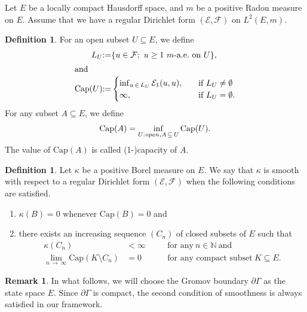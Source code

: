 \documentclass[10pt]{amsart}
\theoremstyle{definition}\newtheorem{defi}[theo]{Definition}\newtheorem{rema}[theo]{Remark}\newtheorem{exam}[theo]{Example}\newtheorem{exem}[theo]{Example}\newtheorem{nota}[theo]{Notation}
\newcommand{\ce}{\mathcal{E}}
\newcommand{\cf}{\mathcal{F}}
\newcommand{\bn}{\mathbb{N}}
\newcommand{\Capp}{\mathrm{Cap}}
\begin{document}
Let $E$ be a locally compact Hausdorff space, and $m$ be a positive Radon measure on $E$. Assume that we have a regular Dirichlet form $(\ce,\cf)$ on $L^2(E,m)$.
\begin{defi}
For an open subset $U\subseteq E$, we define
\begin{align*}
L_U &{:=}\{u\in\cf;\ u\geq1\ m\mathchar`-\text{a.e.\ on}\ U\},
\\
\intertext{and}
\Capp(U)&{:=}
\begin{cases}
\inf_{u\,\in\,L_U}\ce_1(u,u),\quad &\text{if}\ L_U\neq\emptyset\\
\infty,\ &\text{if}\ L_U=\emptyset.
\end{cases}
\end{align*}
For any subset $A\subseteq E$, we define
\begin{align*}
\Capp(A)=\inf_{U:{\textit open}, A\,\subseteq\,U}\Capp(U).
\end{align*}
The value of $\Capp(A)$ is called (1-)capacity of $A$.
\end{defi}

\begin{defi}\label{sm-measure}
Let $\kappa$ be a positive Borel measure on $E$. We say that $\kappa$ is smooth with respect to a regular Dirichlet form $(\ce,\cf)$ when the following conditions are satisfied.
\begin{enumerate}
\item\label{defi6.5.1} $\kappa(B)=0$ whenever $\Capp(B)=0$ and
\item\label{defi6.5.2} there exists an increasing sequence $(C_n)$ of closed subsets of $E$ such that
\begin{align*}
\kappa(C_n)&<\infty\quad &&\text{for\ any}\ n\in\bn\ \text{and}\\
\lim_{n\,\to\,\infty}\Capp(K\setminus C_n)&=0\quad &&\text{for\ any\ compact\ subset}\ K\subseteq E.
\end{align*}
\end{enumerate}
\end{defi}

\begin{rema}\label{rem-cpt}
In what follows, we will choose the Gromov boundary $\partial\Gamma$ as the state space $E$. Since $\partial\Gamma$ is compact, the second condition of smoothness is always satisfied in our framework.
\end{rema}
\end{document}
